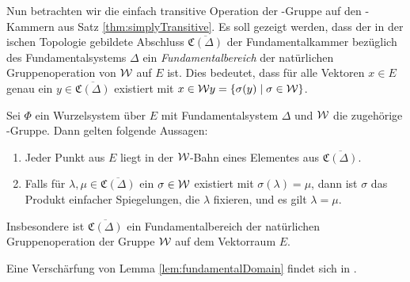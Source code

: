 Nun betrachten wir die einfach transitive Operation der \weyl\hyp{}Gruppe auf den \weyl\hyp{}Kammern aus Satz \ref{thm:simplyTransitive}.
Es soll gezeigt werden, dass der in der \euklid ischen Topologie gebildete Abschluss $\overline{\mathfrak{C}(\Delta)}$ der Fundamentalkammer bezüglich des Fundamentalsystems $\Delta$ ein \emph{Fundamentalbereich} der natürlichen Gruppenoperation von $\mathcal{W}$ auf $E$ ist.
Dies bedeutet, dass für alle Vektoren $x \in E$ genau ein $y \in \overline{\mathfrak{C}(\Delta)}$ existiert mit $x \in \mathcal{W} y = \{\sigma(y) \mid \sigma \in \mathcal{W}\}$.

\begin{lem}
  \label{lem:fundamentalDomain}
  Sei $\Phi$ ein Wurzelsystem über $E$ mit Fundamentalsystem $\Delta$ und $\mathcal{W}$ die zugehörige \weyl\hyp{}Gruppe.
  Dann gelten folgende Aussagen:
  \begin{enumerate}[(1)]
    \item Jeder Punkt aus $E$ liegt in der $\mathcal{W}$\hyp{}Bahn eines Elementes aus  $\overline{\mathfrak{C}(\Delta)}$.
    \item Falls für $\lambda, \mu \in \overline{\mathfrak{C}(\Delta)}$ ein $\sigma \in \mathcal{W}$ existiert mit $\sigma (\lambda) = \mu$, dann ist $\sigma$ das Produkt einfacher Spiegelungen, die $\lambda$ fixieren, und es gilt $\lambda = \mu$.
  \end{enumerate}
  Insbesondere ist $\overline{\mathfrak{C}(\Delta)}$ ein Fundamentalbereich der natürlichen Gruppenoperation der Gruppe $\mathcal{W}$ auf dem Vektorraum $E$.
\end{lem}

Eine Verschärfung von Lemma \ref{lem:fundamentalDomain} findet sich in \cite[S.22]{humphreys1992reflection}.

